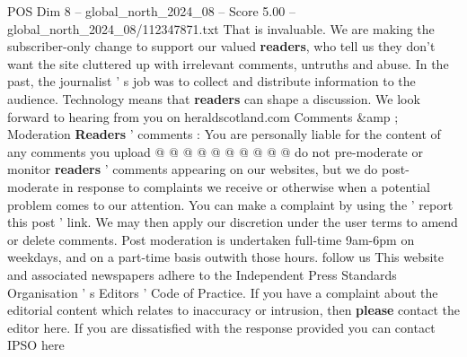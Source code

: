 \begin{textsample}{POS Dim 8 – global\_north\_2024\_08 – Score 5.00 – global\_north\_2024\_08/112347871.txt}
That is invaluable.
We are making the subscriber-only change to support our valued \textbf{readers}, who tell us they don't want the site cluttered up with irrelevant comments, untruths and abuse.
In the past, the journalist ' s job was to collect and distribute information to the audience.
Technology means that \textbf{readers} can shape a discussion.
We look forward to hearing from you on heraldscotland.com Comments \&amp ; Moderation \textbf{Readers} ' comments : You are personally liable for the content of any comments you upload @ @ @ @ @ @ @ @ @ @ do not pre-moderate or monitor \textbf{readers} ' comments appearing on our websites, but we do post-moderate in response to complaints we receive or otherwise when a potential problem comes to our attention.
You can make a complaint by using the ' report this post ' link.
We may then apply our discretion under the user terms to amend or delete comments.
Post moderation is undertaken full-time 9am-6pm on weekdays, and on a part-time basis outwith those hours. follow us This website and associated newspapers adhere to the Independent Press Standards Organisation ' s Editors ' Code of Practice.
If you have a complaint about the editorial content which relates to inaccuracy or intrusion, then \textbf{please} contact the editor here.
If you are dissatisfied with the response provided you can contact IPSO here

\end{textsample}
